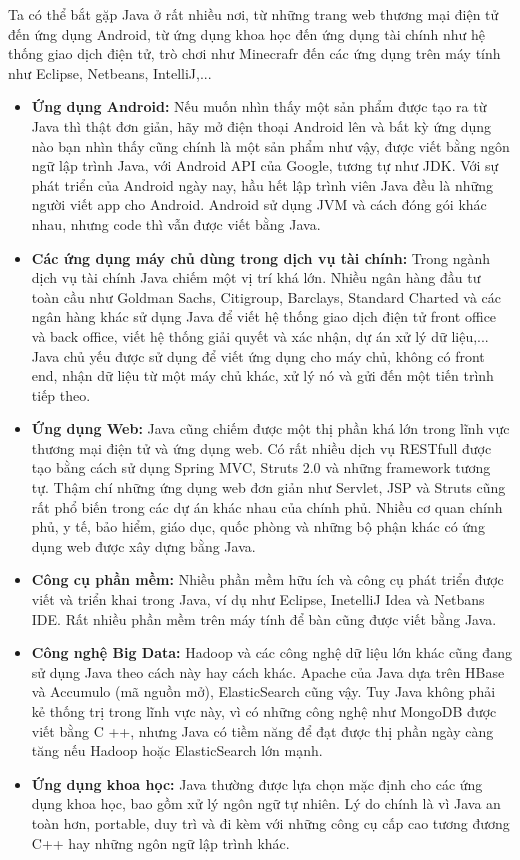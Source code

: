 Ta có thể bắt gặp Java ở rất nhiều nơi, từ những trang web thương mại điện tử đến ứng dụng Android, từ ứng dụng khoa học đến ứng dụng tài chính như hệ thống giao dịch điện tử, trò chơi như Minecrafr đến các ứng dụng trên máy tính như Eclipse, Netbeans, IntelliJ,...
\begin{itemize}
    \item \textbf{Ứng dụng Android:} Nếu muốn nhìn thấy một sản phẩm được tạo ra từ Java thì thật đơn giản, hãy mở điện thoại Android lên và bất kỳ ứng dụng nào bạn nhìn thấy cũng chính là một sản phẩm như vậy, được viết bằng ngôn ngữ lập trình Java, với Android API của Google, tương tự như JDK. Với sự phát triển của Android ngày nay, hầu hết lập trình viên Java đều là những người viết app cho Android. Android sử dụng JVM và cách đóng gói khác nhau, nhưng code thì vẫn được viết bằng Java.
    \item \textbf{Các ứng dụng máy chủ dùng trong dịch vụ tài chính:} Trong ngành dịch vụ tài chính Java chiếm một vị trí khá lớn. Nhiều ngân hàng đầu tư toàn cầu như Goldman Sachs, Citigroup, Barclays, Standard Charted và các ngân hàng khác sử dụng Java để viết hệ thống giao dịch điện tử front office và back office, viết hệ thống giải quyết và xác nhận, dự án xử lý dữ liệu,... Java chủ yếu được sử dụng để viết ứng dụng cho máy chủ, không có front end, nhận dữ liệu từ một máy chủ khác, xử lý nó và gửi đến một tiến trình tiếp theo.
    \item \textbf{Ứng dụng Web:} Java cũng chiếm được một thị phần khá lớn trong lĩnh vực thương mại điện tử và ứng dụng web. Có rất nhiều dịch vụ RESTfull được tạo bằng cách sử dụng Spring MVC, Struts 2.0 và những framework tương tự. Thậm chí những ứng dụng web đơn giản như Servlet, JSP và Struts cũng rất phổ biến trong các dự án khác nhau của chính phủ. Nhiều cơ quan chính phủ, y tế, bảo hiểm, giáo dục, quốc phòng và những bộ phận khác có ứng dụng web được xây dựng bằng Java.
    \item \textbf{Công cụ phần mềm:} Nhiều phần mềm hữu ích và công cụ phát triển được viết và triển khai trong Java, ví dụ như Eclipse, InetelliJ Idea và Netbans IDE. Rất nhiều phần mềm trên máy tính để bàn cũng được viết bằng Java. 
    \item \textbf{Công nghệ Big Data:} Hadoop và các công nghệ dữ liệu lớn khác cũng đang sử dụng Java theo cách này hay cách khác. Apache của Java dựa trên HBase và Accumulo (mã nguồn mở), ElasticSearch cũng vậy. Tuy Java không phải kẻ thống trị trong lĩnh vực này, vì có những công nghệ như MongoDB được viết bằng C ++, nhưng Java có tiềm năng để đạt được thị phần ngày càng tăng nếu Hadoop hoặc ElasticSearch lớn mạnh.
    \item \textbf{Ứng dụng khoa học:} Java thường được lựa chọn mặc định cho các ứng dụng khoa học, bao gồm xử lý ngôn ngữ tự nhiên. Lý do chính là vì Java an toàn hơn, portable, duy trì và đi kèm với những công cụ cấp cao tương đương C++ hay những ngôn ngữ lập trình khác.
\end{itemize}

